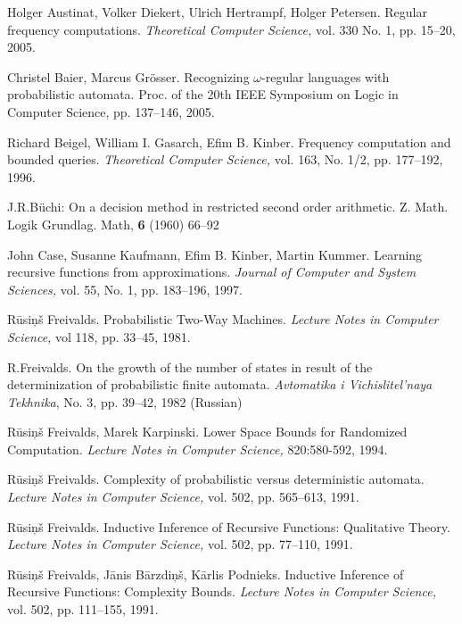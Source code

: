 \documentclass{llncs}
\begin{document}
\begin{thebibliography}{99}

Holger Austinat, Volker Diekert, Ulrich Hertrampf, Holger Petersen.
Regular frequency computations.
{\em Theoretical Computer Science,} vol. 330 No. 1, pp. 15--20, 2005.

Christel Baier, Marcus Gr\" osser.
Recognizing $\omega$-regular languages with probabilistic automata.
Proc. of the 20th IEEE Symposium on Logic in Computer Science, pp. 137--146, 2005.

Richard Beigel, William I. Gasarch, Efim B. Kinber.
Frequency computation and bounded queries.
{\em Theoretical Computer Science,} vol. 163, No. 1/2, pp. 177--192, 1996. 

%
J.R.B\"uchi:
On a decision method in restricted second order arithmetic. 
Z. Math. Logik Grundlag. Math, {\bf 6} (1960) 66--92
%

John Case, Susanne Kaufmann, Efim B. Kinber,  Martin Kummer.
Learning recursive functions from approximations.
{\em Journal of Computer and System Sciences,} vol. 55, No. 1, pp. 183--196, 1997. 

R\= usi\c n\v s Freivalds.
Probabilistic Two-Way Machines.
{\em Lecture Notes in Computer Science,} vol 118, pp. 33--45, 1981. 

\iffalse

R.Freivalds.
On the growth of the number of states in result of the determinization of probabilistic finite automata.
\textit{Avtomatika i Vichislitel'naya Tekhnika}, No. 3, pp. 39--42, 1982 (Russian)


R\= usi\c n\v s Freivalds, Marek Karpinski. 
Lower Space Bounds for Randomized Computation. 
{\em Lecture Notes in Computer Science,} 820:580-592, 1994. 



R\= usi\c n\v s Freivalds.
Complexity of probabilistic versus deterministic automata. 
{\em Lecture Notes in Computer Science,} vol. 502, pp. 565--613, 1991.


R\= usi\c n\v s Freivalds.
Inductive Inference of Recursive Functions: Qualitative Theory.
{\em Lecture Notes in Computer Science,} vol. 502, pp. 77--110, 1991.

R\= usi\c n\v s Freivalds, J\= anis B\= arzdi\c n\v s, K\= arlis Podnieks. 
Inductive Inference of Recursive Functions: Complexity Bounds.
{\em Lecture Notes in Computer Science,} vol. 502, pp. 111--155, 1991.



\end{thebibliography}
\end{document}
